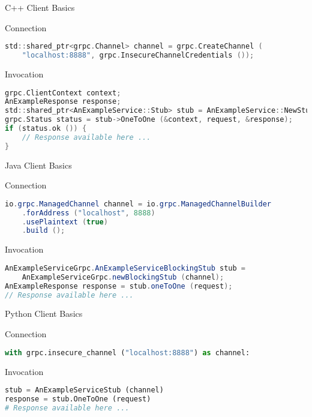 \begin{frame}[fragile]{C++ Client Basics}
    \begin{block}{Connection}
\begin{lstlisting}[language=c,style=mini]
std::shared_ptr<grpc.Channel> channel = grpc.CreateChannel (
    "localhost:8888", grpc.InsecureChannelCredentials ());
\end{lstlisting}
    \end{block}

    \bigskip

    \begin{block}{Invocation}
\begin{lstlisting}[language=c,style=mini]
grpc.ClientContext context;
AnExampleResponse response;
std::shared_ptr<AnExampleService::Stub> stub = AnExampleService::NewStub (channel);
grpc.Status status = stub->OneToOne (&context, request, &response);
if (status.ok ()) {
    // Response available here ...
}
\end{lstlisting}
    \end{block}
\end{frame}


\begin{frame}[fragile]{Java Client Basics}
    \begin{block}{Connection}
\begin{lstlisting}[language=java,style=mini]
io.grpc.ManagedChannel channel = io.grpc.ManagedChannelBuilder
    .forAddress ("localhost", 8888)
    .usePlaintext (true)
    .build ();
\end{lstlisting}
    \end{block}

    \bigskip

    \begin{block}{Invocation}
\begin{lstlisting}[language=java,style=mini]
AnExampleServiceGrpc.AnExampleServiceBlockingStub stub =
    AnExampleServiceGrpc.newBlockingStub (channel);
AnExampleResponse response = stub.oneToOne (request);
// Response available here ...
\end{lstlisting}
    \end{block}
\end{frame}


\begin{frame}[fragile]{Python Client Basics}
    \begin{block}{Connection}
\begin{lstlisting}[language=python,style=mini]
with grpc.insecure_channel ("localhost:8888") as channel:
\end{lstlisting}
    \end{block}

    \bigskip

    \begin{block}{Invocation}
\begin{lstlisting}[language=python,style=mini]
stub = AnExampleServiceStub (channel)
response = stub.OneToOne (request)
# Response available here ...
\end{lstlisting}
    \end{block}
\end{frame}


